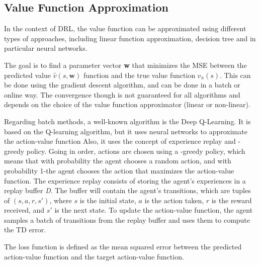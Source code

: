 \subsection{Value Function Approximation}
In the context of DRL, the value function can be approximated using different types of approaches, including linear function approximation, decision tree and in particular neural networks.

The goal is to find a parameter vector \textbf{w} that minimizes the MSE between the predicted value $\hat{v}(s,\textbf{w})$ function and the true value function $v_\pi(s)$.
This can be done using the gradient descent algorithm, and can be done in a batch or online way.
The convergence though is not guaranteed for all algorithms and depends on the choice of the value function approximator (linear or non-linear).

Regarding batch methods, a well-known algorithm is the Deep Q-Learning.
It is based on the Q-learning algorithm, but it uses neural networks to approximate the action-value function
Also, it uses the concept of experience replay and \epsilon-greedy policy.
Going in order, actions are chosen using a \epsilon-greedy policy, which means that with probability \epsilon the agent chooses a random action, and with probability 1-\epsilon the agent chooses the action that maximizes the action-value function.
The experience replay consists of storing the agent's experiences in a replay buffer \textit{D}.
The buffer will contain the agent's transitions, which are tuples of $(s, a, r, s')$, where $s$ is the initial state, $a$ is the action taken, $r$ is the reward received, and $s'$ is the next state.
To update the action-value function, the agent samples a batch of transitions from the replay buffer and uses them to compute the TD error. %

The loss function is defined as the mean squared error between the predicted action-value function and the target action-value function.


















